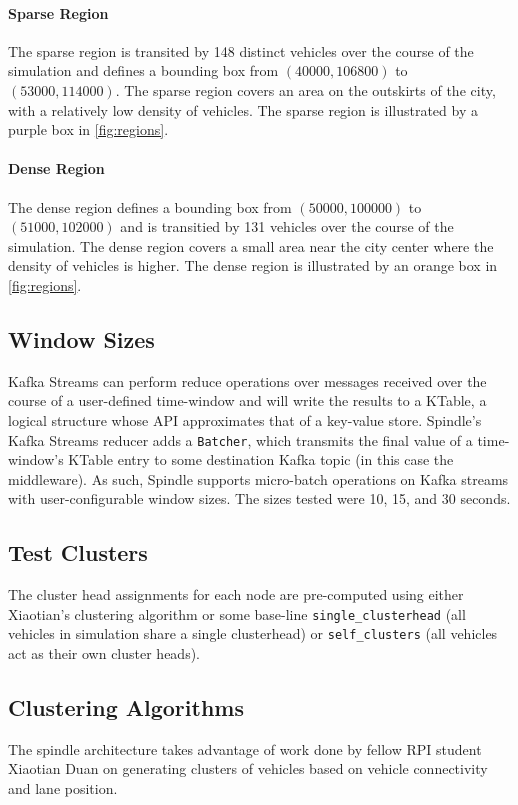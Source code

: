 \documentclass{thesis}
\begin{document}
    \paragraph{Sparse Region}
        The sparse region is transited by 148 distinct vehicles over the course of the simulation and defines a bounding
        box from $(40000, 106800)$ to $(53000, 114000)$. The sparse region covers an area on the outskirts of the city,
        with a relatively low density of vehicles. The sparse region is illustrated by a purple box in \ref{fig:regions}.
    \paragraph{Dense Region}
        The dense region defines a bounding box from $(50000, 100000)$ to $(51000, 102000)$ and is transitied by
        131 vehicles over the course of the simulation. The dense region covers a small area near the city center
        where the density of vehicles is higher. The dense region is illustrated by an orange box in \ref{fig:regions}.

\subsection{Window Sizes}
    Kafka Streams can perform reduce operations over messages received over the course of a user-defined time-window
    and will write the results to a KTable, a logical structure whose API approximates that of a key-value store. %
    Spindle's Kafka Streams reducer adds a \verb|Batcher|, which transmits the final value of a time-window's KTable
    entry to some destination Kafka topic (in this case the middleware). As such, Spindle supports micro-batch operations
    on Kafka streams with user-configurable window sizes. The sizes tested were 10, 15, and 30 seconds.
\subsection{Test Clusters}
    The cluster head assignments for each node are pre-computed using either Xiaotian's %
    clustering algorithm or some base-line \verb|single_clusterhead| (all vehicles in simulation share a single clusterhead)
    or \verb|self_clusters| (all vehicles act as their own cluster heads).
\subsection{Clustering Algorithms}
    The spindle architecture takes advantage of work done by fellow RPI student Xiaotian Duan on generating
    clusters of vehicles based on vehicle connectivity and lane position. 
\end{document}
